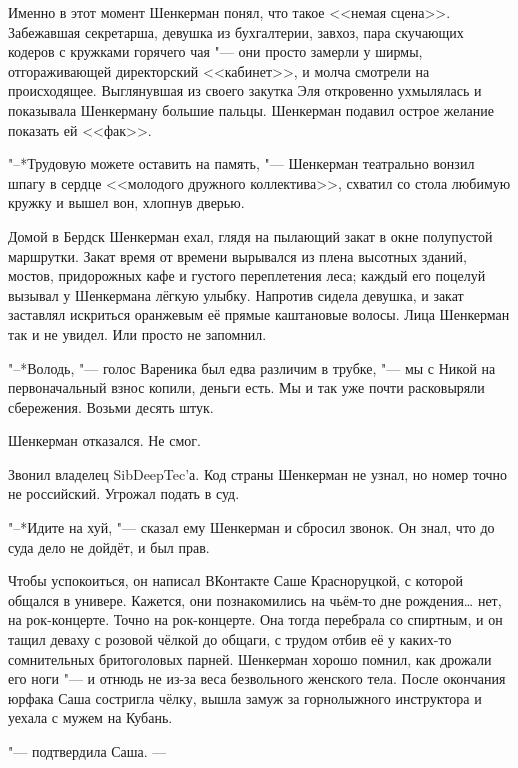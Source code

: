 Именно в этот момент Шенкерман понял, что такое <<немая сцена>>.
Забежавшая секретарша, девушка из бухгалтерии, завхоз, пара скучающих кодеров с кружками горячего чая "--- они просто замерли у ширмы, отгораживающей директорский <<кабинет>>, и молча смотрели на происходящее.
Выглянувшая из своего закутка Эля откровенно ухмылялась и показывала Шенкерману большие пальцы.
Шенкерман подавил острое желание показать ей <<фак>>.

"--*Трудовую можете оставить на память, "--- Шенкерман театрально вонзил шпагу в сердце <<молодого дружного коллектива>>, схватил со стола любимую кружку и вышел вон, хлопнув дверью.

\asterism

Домой в Бердск Шенкерман ехал, глядя на пылающий закат в окне полупустой маршрутки.
Закат время от времени вырывался из плена высотных зданий, мостов, придорожных кафе и густого переплетения леса;
каждый его поцелуй вызывал у Шенкермана лёгкую улыбку.
Напротив сидела девушка, и закат заставлял искриться оранжевым её прямые каштановые волосы.
Лица Шенкерман так и не увидел.
Или просто не запомнил.

"--*Володь, "--- голос Вареника был едва различим в трубке, "--- мы с Никой на первоначальный взнос копили, деньги есть.
Мы и так уже почти расковыряли сбережения.
Возьми десять штук.

Шенкерман отказался.
Не смог.

Звонил владелец SibDeepTec'а.
Код страны Шенкерман не узнал, но номер точно не российский.
Угрожал подать в суд.

"--*Идите на хуй, "--- сказал ему Шенкерман и сбросил звонок.
Он знал, что до суда дело не дойдёт, и был прав.

Чтобы успокоиться, он написал ВКонтакте Саше Красноруцкой, с которой общался в универе.
Кажется, они познакомились на чьём-то дне рождения\dots{} нет, на рок-концерте.
Точно на рок-концерте.
Она тогда перебрала со спиртным, и он тащил деваху с розовой чёлкой до общаги, с трудом отбив её у каких-то сомнительных бритоголовых парней.
Шенкерман хорошо помнил, как дрожали его ноги "--- и отнюдь не из-за веса безвольного женского тела.
После окончания юрфака Саша состригла чёлку, вышла замуж за горнолыжного инструктора и уехала с мужем на Кубань.

\hspace{0.2em}


"--- подтвердила Саша. ---

